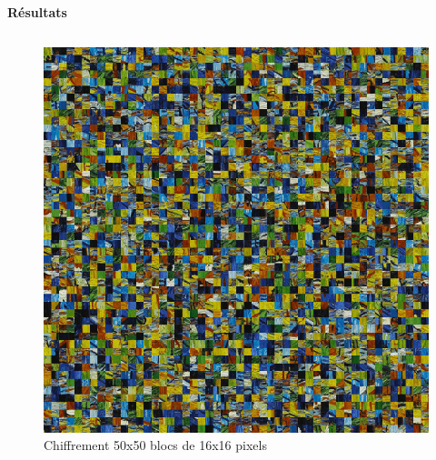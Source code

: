 \documentclass{beamer}
\begin{document}
\begin{frame}[t]
\begin{columns}[t]
\begin{column}{.5\linewidth}
\begin{block}{\centering \textbf{Résultats}}
\begin{columns}[t]
                        \begin{column}{.25\linewidth}
                            \begin{figure}[t]
                                \includegraphics[width=\linewidth]{rsc/van_gogh_50_12.png}\\
                                {\small Chiffrement 50x50 blocs de 16x16 pixels}
                            \end{figure}
                        \end{column}
                    \end{columns}


\end{block}
\end{column}
\end{columns}
\end{frame}
\end{document}
